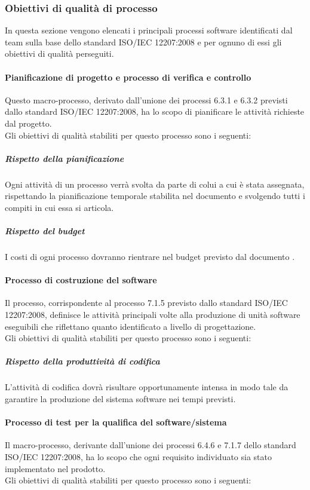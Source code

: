 		\subsubsection{Obiettivi di qualità di processo}
		In questa sezione vengono elencati i principali processi software identificati dal team sulla base dello standard ISO/IEC 12207:2008 e per ognuno di essi gli obiettivi di qualità perseguiti.
			\paragraph{Pianificazione di progetto e processo di verifica e controllo}
			Questo macro-processo, derivato dall'unione dei processi 6.3.1 e 6.3.2 previsti dallo standard ISO/IEC 12207:2008, ha lo scopo di pianificare le attività richieste dal progetto.
			\\Gli obiettivi di qualità stabiliti per questo processo sono i seguenti:

				\subparagraph{Rispetto della pianificazione} 
				Ogni attività di un processo verrà svolta da parte di colui a cui è stata assegnata, rispettando la pianificazione temporale stabilita nel documento \PdP{} e svolgendo tutti i compiti in cui essa si articola. 
				\subparagraph{Rispetto del budget}   
				I costi di ogni processo dovranno rientrare nel budget previsto dal documento \PdP.
				
			\paragraph{Processo di costruzione del software}
			Il processo, corrispondente al processo 7.1.5 previsto dallo standard ISO/IEC 12207:2008, definisce le attività principali volte alla produzione di unità software eseguibili che riflettano quanto identificato a livello di progettazione.
			\\Gli obiettivi di qualità stabiliti per questo processo sono i seguenti:

				\subparagraph{Rispetto della produttività di codifica}
				L'attività di codifica dovrà risultare opportunamente intensa in modo tale da garantire la produzione del sistema software nei tempi previsti.
				 
				
			\paragraph{Processo di test per la qualifica del software/sistema}

			Il macro-processo, derivante dall'unione dei processi 6.4.6 e 7.1.7 dello standard ISO/IEC 12207:2008, ha lo scopo che ogni requisito individuato sia stato implementato nel prodotto.
			\\Gli obiettivi di qualità stabiliti per questo processo sono i seguenti:

